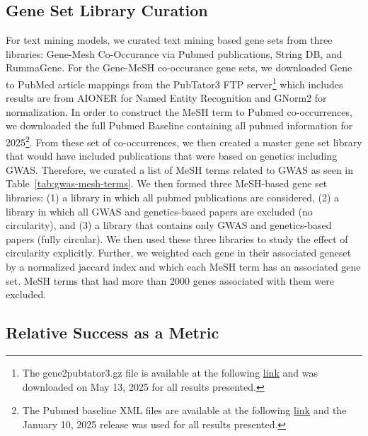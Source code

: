 \subsection{Gene Set Library Curation}
For text mining models, we curated text mining based gene sets from three libraries: Gene-Mesh Co-Occurance via Pubmed publications, String DB, and RummaGene. For the Gene-MeSH co-occurance gene sets, we downloaded Gene to PubMed article mappings from the PubTator3 \cite{wei_pubtator_2024} FTP server\footnote{The gene2pubtator3.gz file is available at the following \href{https://ftp.ncbi.nlm.nih.gov/pub/lu/PubTator3/}{link} and was downloaded on May 13, 2025 for all results presented.} which includes results are from AIONER \cite{luo_aioner_2023} for Named Entity Recognition and GNorm2 \cite{wei_gnorm2_2023} for normalization. In order to construct the MeSH term to Pubmed co-occurrences, we downloaded the full Pubmed Baseline containing all pubmed information for 2025\footnote{The Pubmed baseline XML files are available at the following \href{https://ftp.ncbi.nlm.nih.gov/pubmed/baseline/}{link} and the January 10, 2025 release was used for all results presented.}. From these set of co-occurrences, we then created a master gene set library that would have included publications that were based on genetics including GWAS. Therefore, we curated a list of MeSH terms related to GWAS as seen in Table~\ref{tab:gwas-mesh-terms}. We then formed three MeSH-based gene set libraries: (1) a library in which all pubmed publications are considered, (2) a library in which all GWAS and genetics-based papers are excluded (no circularity), and (3) a library that contains only GWAS and genetics-based papers (fully circular). We then used these three libraries to study the effect of circularity explicitly. Further, we weighted each gene in their associated geneset by a normalized jaccard index and which each MeSH term has an associated gene set. MeSH terms that had more than 2000 genes associated with them were excluded.



\subsection{Relative Success as a Metric}\label{sec:methods-rs}


